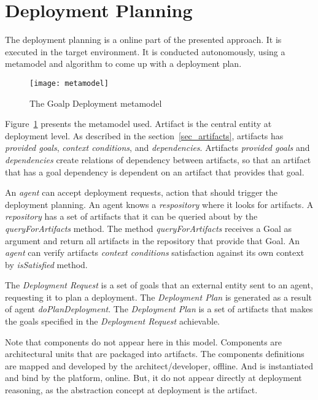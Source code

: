 
\section{Deployment Planning}
\label{sec:planning}

The deployment planning is a online part of the presented approach. It is executed in the target environment. It is conducted autonomously, using a metamodel and algorithm to come up with a deployment plan.

\begin{figure}[!htb]
  \centering
  \texttt{[image: metamodel]}
  \caption{The Goalp Deployment metamodel}
  \label{fig:metamodel}
\end{figure}

Figure~\ref{fig:metamodel} presents the metamodel used. Artifact is the central entity at deployment level. As described in the section~\ref{sec_artifacts}, artifacts has \emph{provided goals}, \emph{context conditions}, and \emph{dependencies}.
Artifacts \emph{provided goals} and \emph{dependencies} create relations of dependency between artifacts, so that an artifact that has a goal dependency is dependent on an artifact that provides that goal. %

An \emph{agent} can accept deployment requests, action that should trigger the deployment planning. An agent knows a \emph{respository} where it looks for artifacts.
A \emph{repository} has a set of artifacts that it can be queried about by the \emph{queryForArtifacts} method. The method \emph{queryForArtifacts} receives a Goal as argument and return all artifacts in the repository that provide that Goal. An \emph{agent} can verify artifacts \emph{context conditions} satisfaction against its own context by \emph{isSatisfied} method.

The \emph{Deployment Request} is a set of goals that an external entity sent to an agent, requesting it to plan a deployment. The \emph{Deployment Plan} is generated as a result of agent \emph{doPlanDeployment}. The \emph{Deployment Plan} is a set of artifacts that makes the goals specified in the \emph{Deployment Request} achievable.

Note that components do not appear here in this model. Components are architectural units that are packaged into artifacts. The components definitions are mapped and developed by the architect/developer, offline.  And is instantiated and bind by the platform, online. But, it do not appear directly at deployment reasoning, as the abstraction concept at deployment is the artifact.

